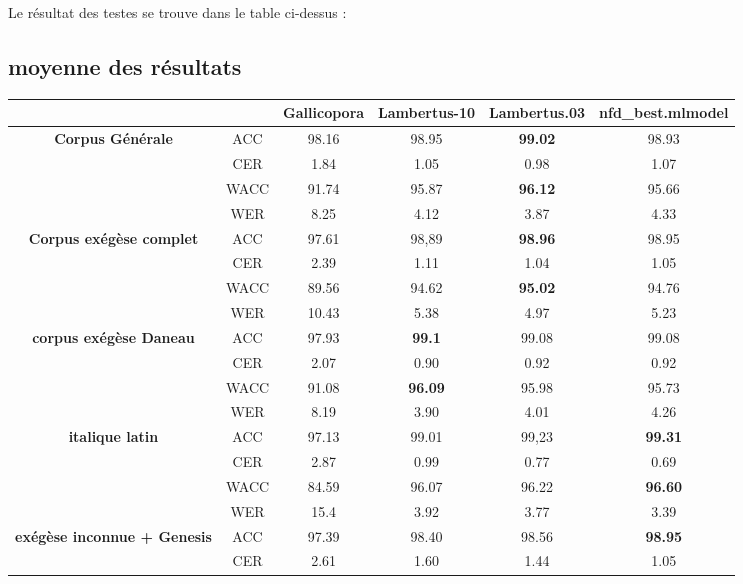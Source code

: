 \documentclass[11pt,french]{article}
\begin{document}
Le résultat des testes se trouve dans le table ci-dessus : 
 \begin{table}[b]
    \subsection{moyenne des résultats}
    \centering
    \small
        \begin{tabular}{|c|c|c|c|c|c|}
        \hline
        &  & \textbf{Gallicopora} & \textbf{Lambertus-10} & \textbf{Lambertus.03} & \textbf{nfd\_best.mlmodel} \\
        \hline
        \multirow{4}{*}{\textbf{Corpus Générale}}
         & ACC & 98.16 & 98.95 & \textbf{99.02} & 98.93\\ 
         & CER & 1.84 & 1.05 & 0.98 & 1.07\\
         & WACC & 91.74 & 95.87 & \textbf{96.12} & 95.66 \\
         & WER & 8.25 & 4.12 & 3.87 & 4.33 \\
        \hline
        \multirow{4}{*}{\textbf{Corpus exégèse complet}} 
         & ACC & 97.61 & 98,89 & \textbf{98.96} & 98.95\\
         & CER & 2.39 & 1.11 & 1.04 & 1.05\\
         & WACC & 89.56 & 94.62 & \textbf{95.02} & 94.76\\
         & WER & 10.43 & 5.38 & 4.97 & 5.23 \\
        \hline
        \multirow{4}{*}{\textbf{corpus exégèse Daneau}}
         & ACC & 97.93 & \textbf{99.1} & 99.08 & 99.08\\
         & CER & 2.07 & 0.90 & 0.92 & 0.92\\
         & WACC & 91.08 & \textbf{96.09} & 95.98 & 95.73 \\
         & WER & 8.19 & 3.90 & 4.01 & 4.26 \\
        \hline
        \multirow{4}{*}{\textbf{italique latin}} 
         & ACC & 97.13 & 99.01 & 99,23 & \textbf{99.31}\\
         & CER & 2.87 & 0.99 & 0.77 & 0.69 \\
         & WACC & 84.59 & 96.07 & 96.22 & \textbf{96.60} \\
         & WER & 15.4 & 3.92 & 3.77 & 3.39 \\
        \hline
        \hline
        \multirow{4}{*}{\textbf{exégèse inconnue + Genesis}} 
        & ACC & 97.39 & 98.40 & 98.56 & \textbf{98.95}\\
        & CER & 2.61 & 1.60 & 1.44 & 1.05\\

\end{tabular}
\end{table}
\end{document}
